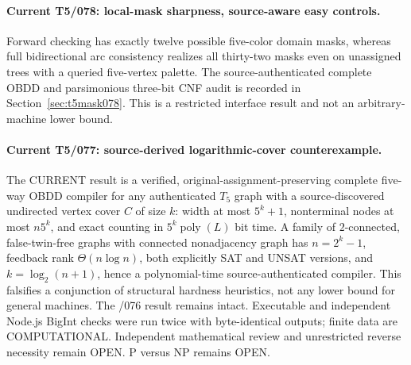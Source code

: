 \documentclass[11pt]{article}
\begin{document}
\paragraph{Current T5/078: local-mask sharpness, source-aware easy controls.}
Forward checking has exactly twelve possible five-color domain masks,
whereas full bidirectional arc consistency realizes all thirty-two masks
even on unassigned trees with a queried five-vertex palette.
The source-authenticated complete OBDD and parsimonious three-bit CNF
audit is recorded in Section~\ref{sec:t5mask078}. This is a restricted
interface result and not an arbitrary-machine lower bound.


\paragraph{Current T5/077: source-derived logarithmic-cover counterexample.}
The CURRENT result is a verified, original-assignment-preserving complete
five-way OBDD compiler for any authenticated $T_5$ graph with a
source-discovered undirected vertex cover $C$ of size $k$:
width at most $5^k+1$, nonterminal nodes at most $n5^k$, and exact
counting in $5^k\operatorname{poly}(L)$ bit time.
A family of $2$-connected, false-twin-free graphs with
connected nonadjacency graph has $n=2^k-1$, feedback rank
$\Theta(n\log n)$, both explicitly SAT and UNSAT versions,
and $k=\log_2(n+1)$, hence a polynomial-time source-authenticated compiler.
This falsifies a conjunction of structural hardness heuristics,
not any lower bound for general machines. The /076 result remains intact.
Executable and independent Node.js BigInt checks were run twice with
byte-identical outputs; finite data are COMPUTATIONAL. Independent
mathematical review and unrestricted reverse necessity remain OPEN.
P versus NP remains OPEN.
\end{document}
